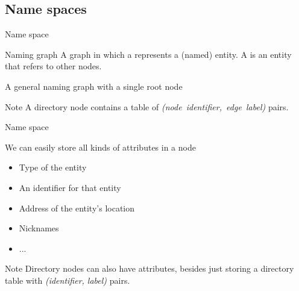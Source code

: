 \subsection{Name spaces}
\begin{slide}{Name space}
  \vspace*{-6pt}
  \begin{block}{Naming graph} 
    A graph in which a  represents a (named) entity. A  is an entity that
    refers to other nodes.
  \end{block}
  \begin{block}{A general naming graph with a single root node}
    \begin{center}
    \end{center}
  \end{block}
  \begin{block}{Note} 
    A directory node contains a table of \emph{(node~identifier,~edge~label)} pairs. 
  \end{block}
\end{slide}
\begin{slide}{Name space}
  \begin{block}{We can easily store all kinds of attributes in a node}
    \begin{itemize}\tightlist
    \item Type of the entity
    \item An identifier for that entity
    \item Address of the entity's location
    \item Nicknames
    \item ...
    \end{itemize}
  \end{block}
  \onslide
  \begin{alertblock}{Note}
    Directory nodes can also have attributes, besides just storing a directory table with \emph{(identifier,
      label)} pairs.
  \end{alertblock}
\end{slide}
